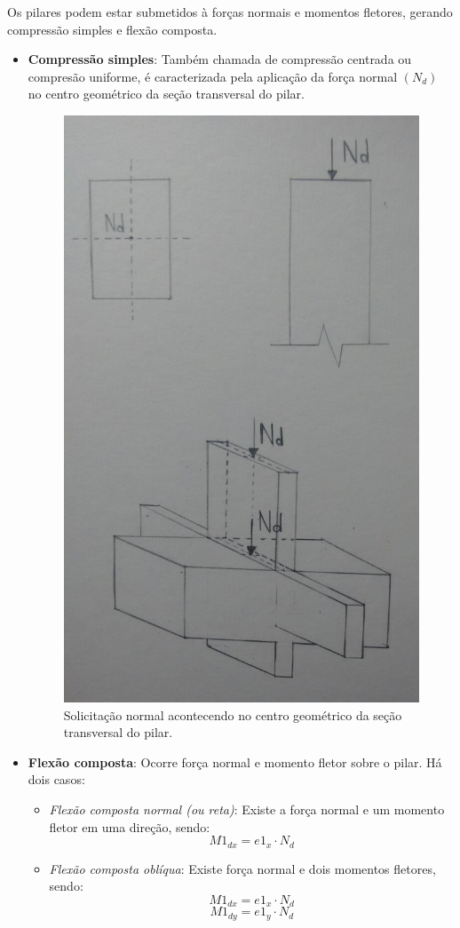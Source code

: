 Os pilares podem estar submetidos à forças normais e momentos fletores, gerando compressão simples e flexão composta.

\begin{itemize}

	\item \textbf{Compressão simples}: Também chamada de compressão centrada ou compresão uniforme, é caracterizada pela aplicação da força normal $(N_d)$ no centro geométrico da seção transversal do pilar.

		\begin{figure}[H]
			\begin{center}
				\caption{Solicitação normal acontecendo no centro geométrico da seção transversal do pilar.}    	
				\includegraphics[height=0.5\textwidth]{Solicitacoes-normais/Imagens/Compressao-simples.jpg}
			\end{center}
		\end{figure}

	\item \textbf{Flexão composta}: Ocorre força normal e momento fletor sobre o pilar. Há dois casos:

		\begin{itemize}
     			\item \textit{Flexão composta normal (ou reta)}: Existe a força normal e um momento fletor em uma direção, sendo:
				$$M1_{dx}=e1_x\cdot N_d$$
				
     			\item \textit{Flexão composta oblíqua}: Existe força normal e dois momentos fletores, sendo:
				$$M1_{dx}=e1_x\cdot N_d$$
				$$M1_{dy}=e1_y\cdot N_d$$
  		\end{itemize}

\end{itemize}

